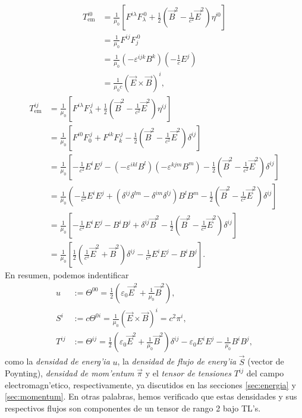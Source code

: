 \begin{align}
T_\text{em}^{i0}  & =\frac{1}{\mu_0}\left[ F^{i\lambda}F_\lambda^{\ 0}+\frac
{1}{2}\left(  \vec{B}^2-\frac{1}{c^2}\vec{E}^2\right)  \eta^{i0}\right] \\
& =\frac{1}{\mu_0}F^{ij}F_j^{\ 0}\\
& =\frac{1}{\mu_0}(-\varepsilon^{ijk}B^k)  (-\frac{1}{c}E^j) \\
& =\frac{1}{\mu_0c}\left(\vec{E}\times\vec{B}\right)^i,
\end{align}%
\begin{align}
T_\text{em}^{ij}  & =\frac{1}{\mu_0}\left[  F^{i\lambda}F_\lambda^{\ j}+\frac
{1}{2}\left( \vec{B}^2-\frac{1}{c^2}\vec{E}^2\right) \eta^{ij}\right] \\
& =\frac{1}{\mu_0}\left[F^{i0}F_0^{\ j}+F^{ik}F_k^{\ j}-\frac{1}{2}\left(
\vec{B}^2-\frac{1}{c^2}\vec{E}^2\right) \delta^{ij}\right] \\
& =\frac{1}{\mu_0}\left[-\frac{1}{c^2}E^i E^j -\left(-\varepsilon^{ikl}B^l\right)  \left(
-\varepsilon^{kjm}B^m \right) -\frac{1}{2}\left(
\vec{B}^2-\frac{1}{c^2}\vec{E}^2\right)\delta^{ij}\right] \\
& =\frac{1}{\mu_0}\left(-\frac{1}{c^2}E^i E^j
+\left(\delta^{ij}\delta^{lm}-\delta^{im}\delta^{lj}\right)B^l B^m
-\frac{1}{2}\left(\vec{B}^2-\frac{1}{c^2}\vec{E}^2\right)\delta^{ij}\right] \\
& =\frac{1}{\mu_0}\left[-\frac{1}{c^2}E^i E^j - B^i B^j +\delta^{ij}\vec{B}^2-\frac{1}{2}\left(\vec{B}^2-\frac{1}{c^2}\vec{E}^2\right)\delta^{ij}\right] \\
& =\frac{1}{\mu_0}\left[\frac{1}{2}\left(\frac{1}{c^2}\vec{E}^2 +\vec{B}^2\right)\delta^{ij}-\frac{1}{c^2}E^i E^j -B^i B^j\right].
\end{align}
En resumen, podemos indentificar
\begin{align}
u &:= \Theta^{00}=\frac{1}{2}\left(\varepsilon_0\vec{E}^2+\frac{1}{\mu_0}\vec{B}^2\right),\label{uTheta}\\
S^i &:= c\Theta^{0i}=\frac{1}{\mu_0}\left(\vec{E}\times\vec{B}\right)^i=c^2\pi^i, \label{STheta}\\
T^{ij} &:= \Theta^{ij}= \frac{1}{2}\left(\varepsilon_0\vec{E}^2+\frac{1}{\mu_0}\vec{B}^2\right)\delta^{ij}-\varepsilon_0 E^i E^j -\frac{1}{\mu_0}B^i B^j , \label{TTheta}
\end{align}
como la \textit{densidad de energ'ia} $u$, la \textit{densidad de flujo de
energ'ia} $\vec{S}$ (vector de Poynting), \textit{densidad de mom'entum}
$\vec{\pi}$ y el \textit{tensor de tensiones} $T^{ij}$ del campo
electromagn'etico, respectivamente, ya discutidos en las secciones \ref{sec:energia} y \ref{sec:momentum}. En otras palabras, hemos verificado que estas densidades y sus respectivos flujos son componentes de un tensor de rango 2 bajo TL's.

